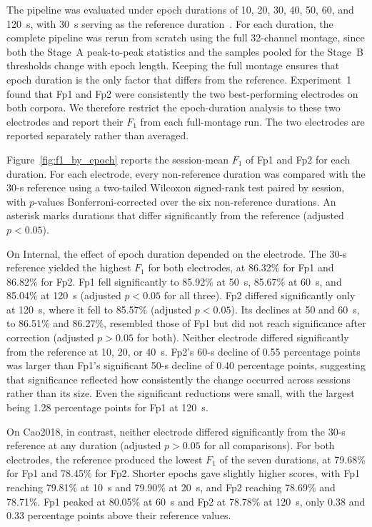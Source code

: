 \documentclass[journal,twoside,web]{ieeecolor}
\begin{document}
 
%
The pipeline was evaluated under epoch durations of 10, 20, 30, 40, 50, 60, and 120~s, with 30~s serving as the reference duration~\citep{ahn2016exploring,chai2017improving,lan2024driving,dai2023detection,chen2022fatigue}.
%
For each duration, the complete pipeline was rerun from scratch using the full 32-channel montage, since both the Stage~A peak-to-peak statistics and the samples pooled for the Stage~B thresholds change with epoch length. Keeping the full montage ensures that epoch duration is the only factor that differs from the reference. Experiment~1 found that Fp1 and Fp2 were consistently the two best-performing electrodes on both corpora. We therefore restrict the epoch-duration analysis to these two electrodes and report their $F_1$ from each full-montage run. The two electrodes are reported separately rather than averaged.
 
%
Figure~\ref{fig:f1_by_epoch} reports the session-mean $F_1$ of Fp1 and Fp2 for each duration. For each electrode, every non-reference duration was compared with the 30-s reference using a two-tailed Wilcoxon signed-rank test paired by session, with $p$-values Bonferroni-corrected over the six non-reference durations. An asterisk marks durations that differ significantly from the reference (adjusted $p < 0.05$).
 
%
On Internal, the effect of epoch duration depended on the electrode. The 30-s reference yielded the highest $F_1$ for both electrodes, at 86.32\% for Fp1 and 86.82\% for Fp2. Fp1 fell significantly to 85.92\% at 50~s, 85.67\% at 60~s, and 85.04\% at 120~s (adjusted $p < 0.05$ for all three). Fp2 differed significantly only at 120~s, where it fell to 85.57\% (adjusted $p < 0.05$). Its declines at 50 and 60~s, to 86.51\% and 86.27\%, resembled those of Fp1 but did not reach significance after correction (adjusted $p > 0.05$ for both). Neither electrode differed significantly from the reference at 10, 20, or 40~s. Fp2's 60-s decline of 0.55 percentage points was larger than Fp1's significant 50-s decline of 0.40 percentage points, suggesting that significance reflected how consistently the change occurred across sessions rather than its size. Even the significant reductions were small, with the largest being 1.28 percentage points for Fp1 at 120~s.
 
%
On Cao2018, in contrast, neither electrode differed significantly from the 30-s reference at any duration (adjusted $p > 0.05$ for all comparisons). For both electrodes, the reference produced the lowest $F_1$ of the seven durations, at 79.68\% for Fp1 and 78.45\% for Fp2. Shorter epochs gave slightly higher scores, with Fp1 reaching 79.81\% at 10~s and 79.90\% at 20~s, and Fp2 reaching 78.69\% and 78.71\%. Fp1 peaked at 80.05\% at 60~s and Fp2 at 78.78\% at 120~s, only 0.38 and 0.33 percentage points above their reference values. 
%
%
%
%
%
 
\end{document}
